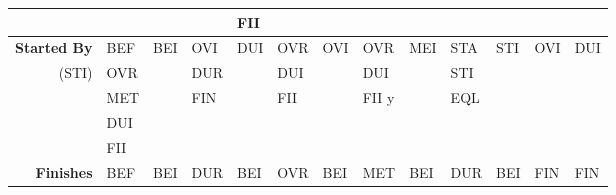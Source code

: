 \documentclass[11pt]{report}
\newenvironment{vvarmargin}[2]
{
  \begin{list}{}
  {
    \setlength{\topsep}{0pt}
    \setlength{\leftmargin}{0pt}
    \setlength{\rightmargin}{0pt}
    \setlength{\listparindent}{\parindent}
    \setlength{\itemindent}{\parindent}
    \setlength{\parsep}{0pt plus 1pt}
    \addtolength{\leftmargin}{#1}\addtolength{\rightmargin}{#2}
  }
  \item
}
{
  \end{list}
}
\begin{document}
\begin{table}[p]
\begin{vvarmargin}{-4cm}{-4cm}
\begin{center}
\begin{tabular}[t]{|r|l|l|l|l|l|l|l|l|l|l|l|l|}
                                        &                         &                         &                         & FII                     &                         &                         &                         &                         &                         &                         &                         &                         \\
                \hline
                \textbf{Started By}     & BEF                     & BEI                     & OVI                     & DUI                     & OVR                     & OVI                     & OVR                     & MEI                     & STA                     & STI                     & OVI                     & DUI                     \\
                (STI)                   & OVR                     &                         & DUR                     &                         & DUI                     &                         & DUI                     &                         & STI                     &                         &                         &                         \\
                                        & MET                     &                         & FIN                     &                         & FII                     &                         & FII       y             &                         & EQL                     &                         &                         &                         \\
                                        & DUI                     &                         &                         &                         &                         &                         &                         &                         &                         &                         &                         &                         \\
                                        & FII                     &                         &                         &                         &                         &                         &                         &                         &                         &                         &                         &                         \\
                \hline
                \textbf{Finishes}       & BEF                     & BEI                     & DUR                     & BEI                     & OVR                     & BEI                     & MET                     & BEI                     & DUR                     & BEI                     & FIN                     & FIN                     \\

\end{tabular}
\end{center}
\end{vvarmargin}
\end{table}
\end{document}
